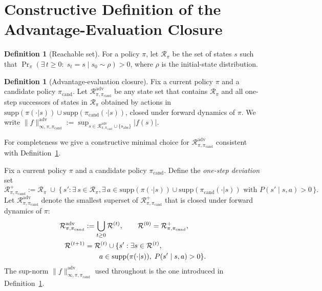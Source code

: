 \documentclass{article}
\theoremstyle{plain}
\theoremstyle{definition}
\newtheorem{definition}[theorem]{Definition}
\theoremstyle{remark}
\begin{document}
\section{Constructive Definition of the Advantage-Evaluation Closure}
\label{app:adv_closure_full}


\begin{definition}[Reachable set]
\label{def:reachable}
For a policy $\pi$, let $\mathcal{R}_\pi$ be the set of states $s$ such that
$\Pr_\pi(\exists\, t\ge 0:\; s_t=s \mid s_0\sim\rho)>0$, where $\rho$ is the initial-state distribution.
\end{definition}

\begin{definition}[Advantage-evaluation closure]
\label{def:adv_closure}
Fix a current policy $\pi$ and a candidate policy $\pi_{\mathrm{cand}}$.
Let $\mathcal{R}_{\pi,\pi_{\mathrm{cand}}}^{\mathrm{adv}}$ be any state set that contains $\mathcal{R}_\pi$ and all one-step successors of states in $\mathcal{R}_\pi$ obtained by actions in $\mathrm{supp}(\pi(\cdot|s))\cup\mathrm{supp}(\pi_{\mathrm{cand}}(\cdot|s))$, closed under forward dynamics of $\pi$.
We write $\|f\|_{\infty,\pi,\pi_{\mathrm{cand}}}^{\mathrm{adv}} := \sup_{s\in \mathcal{R}_{\pi,\pi_{\mathrm{cand}}}^{\mathrm{adv}}\cup\{s_{\mathrm{abs}}\}} |f(s)|$.
\end{definition}


For completeness we give a constructive minimal choice for $\mathcal{R}_{\pi,\pi_{\mathrm{cand}}}^{\mathrm{adv}}$ consistent with Definition~\ref{def:adv_closure}.

Fix a current policy $\pi$ and a candidate policy $\pi_{\mathrm{cand}}$.
Define the \emph{one-step deviation} set
\begin{equation}
\mathcal{R}_{\pi,\pi_{\mathrm{cand}}}^{+}
:=
\mathcal{R}_\pi
\;\cup\;
\bigl\{\,s' : \exists\, s\in\mathcal{R}_\pi,
\exists\, a\in \mathrm{supp}(\pi(\cdot|s))\cup\mathrm{supp}(\pi_{\mathrm{cand}}(\cdot|s))
\text{ with } P(s'\mid s,a)>0\,\bigr\}.
\label{eq:R_plus_def_app}
\end{equation}
Let $\mathcal{R}_{\pi,\pi_{\mathrm{cand}}}^{\mathrm{adv}}$ denote the smallest superset of $\mathcal{R}_{\pi,\pi_{\mathrm{cand}}}^{+}$ that is closed under forward dynamics of $\pi$:
\begin{align}
\mathcal{R}_{\pi,\pi_{\mathrm{cand}}}^{\mathrm{adv}}
&:=
\bigcup_{t\ge 0} \mathcal{R}^{(t)},
\qquad
\mathcal{R}^{(0)}=\mathcal{R}_{\pi,\pi_{\mathrm{cand}}}^{+},
\notag\\
\mathcal{R}^{(t+1)}&=\mathcal{R}^{(t)}\cup\{s' : \exists s\in \mathcal{R}^{(t)},\notag\\
&\qquad a\in \mathrm{supp}(\pi(\cdot|s)),\; P(s'\mid s,a)>0\}.
\label{eq:R_adv_def_app}
\end{align}
The sup-norm $\|f\|_{\infty,\pi,\pi_{\mathrm{cand}}}^{\mathrm{adv}}$ used throughout is the one introduced in Definition~\ref{def:adv_closure}.
\end{document}
